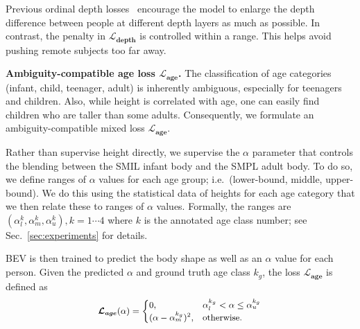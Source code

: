 \documentclass[10pt,twocolumn,letterpaper]{article}
\begin{document}
Previous ordinal depth losses~\cite{chen2016single,pavlakos2018ordinal} encourage the model to enlarge the depth difference between people at different depth layers as much as possible.
In contrast, the penalty in $\boldsymbol{\mathcal{L}_{depth}}$ is controlled within a  range.
This helps avoid pushing remote subjects too far away.

\textbf{Ambiguity-compatible age loss $\boldsymbol{\mathcal{L}_{age}}$.}
The classification of age categories (infant, child, teenager, adult) is inherently ambiguous, especially for teenagers and children.
Also, while height is correlated with age, one can easily find children who are taller than some adults.
Consequently, we formulate an ambiguity-compatible mixed loss $\boldsymbol{\mathcal{L}_{age}}$. 

Rather than supervise height directly, we supervise the $\alpha$ parameter that controls the blending between the SMIL infant body and the SMPL adult body.
To do so, we define ranges of $\alpha$ values for each age group; i.e.~(lower-bound, middle, upper-bound).
We do this using the statistical data of heights for each age category that we then relate these to ranges of $\alpha$ values.
Formally, the ranges are  $(\alpha_{l}^k,\alpha_{m}^k,\alpha_{u}^k),k=1\cdots4$ where $k$ is the annotated age class number; see Sec.~\ref{sec:experiments} for details.

BEV is then trained to predict the body shape as well as an $\alpha$ value for each person.
Given the predicted $\alpha$ and ground truth age class $k_{g}$, the loss $\boldsymbol{\mathcal{L}_{age}}$ is defined as
\begin{equation}
\setlength{\abovedisplayskip}{1pt}
\setlength{\belowdisplayskip}{1pt}
\small
\begin{aligned}
\boldsymbol{\mathcal{L}_{age}}(\alpha)=
\begin{cases} 
      0, & \alpha_{l}^{k_{g}}< \alpha \leq \alpha_{u}^{k_{g}}\\
      (\alpha-\alpha_{m}^{k_{g}})^2, & \mathrm{otherwise.}
\end{cases}
\end{aligned}
\label{eq:age_loss}
\end{equation}
\end{document}
